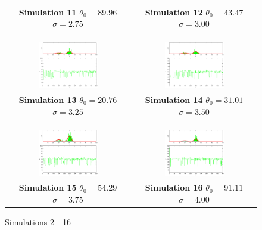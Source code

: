 \begin{figure}
\begin{tabular}{cc}
\textbf{Simulation 11} $\theta_0=   89.96$  $\sigma=    2.75$  & \textbf{Simulation 12} $\theta_0=   43.47$  $\sigma=    3.00$
\end{tabular}
\begin{tabular}{cc} 
\includegraphics[width=0.5\textwidth]{ImaginiLatex/MetropolisExample13.eps} &
\includegraphics[width=0.5\textwidth]{ImaginiLatex/MetropolisExample14.eps} \\
\textbf{Simulation 13} $\theta_0=   20.76$  $\sigma=    3.25$  & \textbf{Simulation 14} $\theta_0=   31.01$  $\sigma=    3.50$
\end{tabular}
\begin{tabular}{cc} 
\includegraphics[width=0.5\textwidth]{ImaginiLatex/MetropolisExample15.eps} &
\includegraphics[width=0.5\textwidth]{ImaginiLatex/MetropolisExample16.eps} \\
\textbf{Simulation 15} $\theta_0=   54.29$  $\sigma=    3.75$  & \textbf{Simulation 16} $\theta_0=   91.11$  $\sigma=    4.00$
\end{tabular}
\caption{Simulations 2 - 16}
\end{figure}
